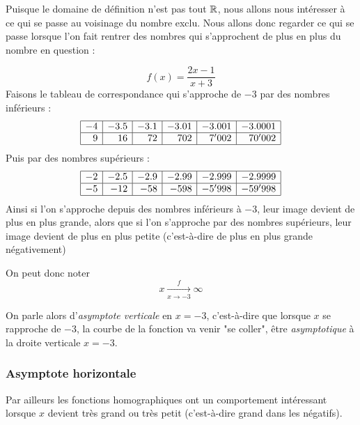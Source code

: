 Puisque le domaine de définition n'est pas tout $\mathbb{R}$, nous allons nous intéresser à ce qui se passe au voisinage du nombre exclu. Nous allons donc regarder ce qui se passe lorsque l'on fait rentrer des nombres qui s'approchent de plus en plus du nombre en question : 

\begin{exemple}
$$
f(x) = \frac{2x-1}{x+3}
$$
Faisons le tableau de correspondance qui s'approche de $-3$ par des nombres inférieurs :
$$
\begin{array}{|r|r|r|r|r|r|}
\hline
-4 & -3.5 & -3.1 & -3.01 & -3.001& -3.0001\\
\hline
9 & 16 & 72 & 702 & 7'002 & 70'002\\
\hline
\end{array}
$$
Puis par des nombres supérieurs :
$$
\begin{array}{|r|r|r|r|r|r|}
\hline
-2 & -2.5 & -2.9 & -2.99 & -2.999& -2.9999\\
\hline
-5 & -12 & -58 & -598 & -5'998 & -59'998\\
\hline
\end{array}
$$
Ainsi si l'on s'approche depuis des nombres inférieurs à $-3$, leur image devient de plus en plus grande, alors que si l'on s'approche par des nombres supérieurs, leur image devient de plus en plus petite (c'est-à-dire de plus en plus grande négativement)

On peut donc noter
$$
x\underset{x\rightarrow-3}{\overset{f}{\longrightarrow}} \infty
$$

On parle alors d'\emph{asymptote verticale} en $x=-3$, c'est-à-dire que lorsque $x$ se rapproche de $-3$, la courbe de la fonction va venir "se coller", être \emph{asymptotique} à la droite verticale $x=-3$.
\end{exemple}

\subsubsection{Asymptote horizontale}

Par ailleurs les fonctions homographiques ont un comportement intéressant lorsque $x$ devient très grand ou très petit (c'est-à-dire grand dans les négatifs).

